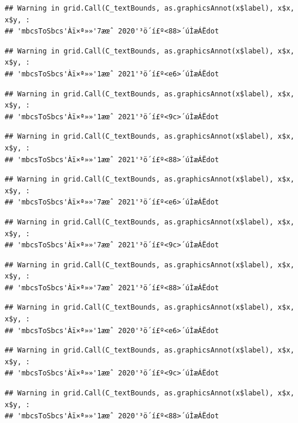 \documentclass[
]{book}
\begin{document}
\begin{verbatim}
## Warning in grid.Call(C_textBounds, as.graphicsAnnot(x$label), x$x, x$y, :
## 'mbcsToSbcs'Àï×ª»»'7æœˆ 2020'³ö´í£º<88>´úÌæÁËdot
\end{verbatim}

\begin{verbatim}
## Warning in grid.Call(C_textBounds, as.graphicsAnnot(x$label), x$x, x$y, :
## 'mbcsToSbcs'Àï×ª»»'1æœˆ 2021'³ö´í£º<e6>´úÌæÁËdot
\end{verbatim}

\begin{verbatim}
## Warning in grid.Call(C_textBounds, as.graphicsAnnot(x$label), x$x, x$y, :
## 'mbcsToSbcs'Àï×ª»»'1æœˆ 2021'³ö´í£º<9c>´úÌæÁËdot
\end{verbatim}

\begin{verbatim}
## Warning in grid.Call(C_textBounds, as.graphicsAnnot(x$label), x$x, x$y, :
## 'mbcsToSbcs'Àï×ª»»'1æœˆ 2021'³ö´í£º<88>´úÌæÁËdot
\end{verbatim}

\begin{verbatim}
## Warning in grid.Call(C_textBounds, as.graphicsAnnot(x$label), x$x, x$y, :
## 'mbcsToSbcs'Àï×ª»»'7æœˆ 2021'³ö´í£º<e6>´úÌæÁËdot
\end{verbatim}

\begin{verbatim}
## Warning in grid.Call(C_textBounds, as.graphicsAnnot(x$label), x$x, x$y, :
## 'mbcsToSbcs'Àï×ª»»'7æœˆ 2021'³ö´í£º<9c>´úÌæÁËdot
\end{verbatim}

\begin{verbatim}
## Warning in grid.Call(C_textBounds, as.graphicsAnnot(x$label), x$x, x$y, :
## 'mbcsToSbcs'Àï×ª»»'7æœˆ 2021'³ö´í£º<88>´úÌæÁËdot
\end{verbatim}

\begin{verbatim}
## Warning in grid.Call(C_textBounds, as.graphicsAnnot(x$label), x$x, x$y, :
## 'mbcsToSbcs'Àï×ª»»'1æœˆ 2020'³ö´í£º<e6>´úÌæÁËdot
\end{verbatim}

\begin{verbatim}
## Warning in grid.Call(C_textBounds, as.graphicsAnnot(x$label), x$x, x$y, :
## 'mbcsToSbcs'Àï×ª»»'1æœˆ 2020'³ö´í£º<9c>´úÌæÁËdot
\end{verbatim}

\begin{verbatim}
## Warning in grid.Call(C_textBounds, as.graphicsAnnot(x$label), x$x, x$y, :
## 'mbcsToSbcs'Àï×ª»»'1æœˆ 2020'³ö´í£º<88>´úÌæÁËdot
\end{verbatim}
\end{document}
